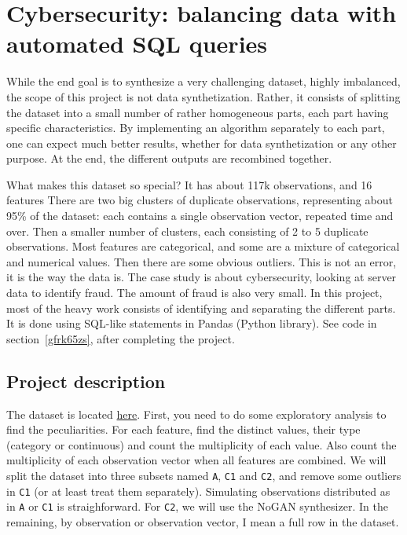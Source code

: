 \documentclass[oneside,10pt]{book}
\begin{document}
\section{Cybersecurity: balancing data with automated SQL queries}\label{balbel}

While the end goal is to synthesize a very challenging dataset, highly imbalanced, the scope of this project is not data synthetization.
 Rather, it consists of splitting the dataset into a small number of rather homogeneous parts, each part having specific characteristics. 
 By implementing an  algorithm separately to each part, one can expect much better results, whether for data synthetization or any other purpose. At the end, the different outputs are recombined together.

What makes this dataset so special? It has about 117k observations, and 16 features There are two big clusters of duplicate observations, representing 
about 95\% of the dataset: each contains a single observation vector, repeated time and over.  Then a smaller number of clusters, each consisting of 2 to 5 duplicate observations. 
Most features are categorical, and some are a mixture of categorical and numerical values. Then there are some obvious outliers.
This is not an error, it is the way the data is. The case study is about cybersecurity, looking at server data to identify fraud. The amount of fraud is also very small. In this project, most of the heavy work consists of identifying and separating the different parts.
 It is done using SQL-like statements in \textcolor{index}{Pandas} (Python library). See code in section~\ref{gfrk65zs},
 after completing the project.

\subsection{Project description}

The dataset is located \href{https://raw.githubusercontent.com/VincentGranville/Main/main/iot_security.csv}{here}.
 First, you need to do some exploratory analysis to find the peculiarities. For each feature, find the distinct values, their type (category or continuous) and count the multiplicity of each value. Also count the multiplicity of each observation vector when all features
 are combined. We will split the dataset into three subsets named \texttt{A}, \texttt{C1} and \texttt{C2}, 
and remove some outliers in \texttt{C1} (or at least treat them separately). Simulating observations distributed as in 
\texttt{A} or \texttt{C1} is straighforward.
 For \texttt{C2}, we will use the NoGAN synthesizer. In the remaining, by observation or observation vector, I mean a full row in the dataset. 
\end{document}
